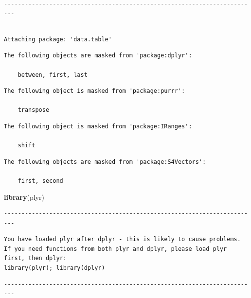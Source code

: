 \documentclass[]{article}
\newenvironment{Shaded}{\begin{snugshade}}{\end{snugshade}}
\newcommand{\KeywordTok}[1]{\textcolor[rgb]{0.13,0.29,0.53}{\textbf{#1}}}
\newcommand{\NormalTok}[1]{#1}
\begin{document}
\begin{verbatim}
-------------------------------------------------------------------------
\end{verbatim}

\begin{verbatim}

Attaching package: 'data.table'
\end{verbatim}

\begin{verbatim}
The following objects are masked from 'package:dplyr':

    between, first, last
\end{verbatim}

\begin{verbatim}
The following object is masked from 'package:purrr':

    transpose
\end{verbatim}

\begin{verbatim}
The following object is masked from 'package:IRanges':

    shift
\end{verbatim}

\begin{verbatim}
The following objects are masked from 'package:S4Vectors':

    first, second
\end{verbatim}

\begin{Shaded}
\begin{Highlighting}[]
\KeywordTok{library}\NormalTok{(plyr)}
\end{Highlighting}
\end{Shaded}

\begin{verbatim}
-------------------------------------------------------------------------
\end{verbatim}

\begin{verbatim}
You have loaded plyr after dplyr - this is likely to cause problems.
If you need functions from both plyr and dplyr, please load plyr first, then dplyr:
library(plyr); library(dplyr)
\end{verbatim}

\begin{verbatim}
-------------------------------------------------------------------------
\end{verbatim}
\end{document}
